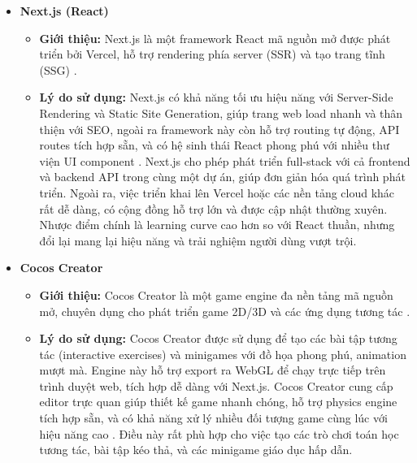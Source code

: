 \begin{itemize}
  \item \textbf{Next.js (React)}
    \begin{itemize}
      \item \textbf{Giới thiệu:} Next.js là một framework React mã nguồn mở được phát triển bởi Vercel, hỗ trợ rendering phía server (SSR) và tạo trang tĩnh (SSG) \cite{nextjsdocs}.
      \item \textbf{Lý do sử dụng:} Next.js có khả năng tối ưu hiệu năng với Server-Side Rendering và Static Site Generation, giúp trang web load nhanh và thân thiện với SEO, ngoài ra framework này còn hỗ trợ routing tự động, API routes tích hợp sẵn, và có hệ sinh thái React phong phú với nhiều thư viện UI component \cite{nextjsdocs}. Next.js cho phép phát triển full-stack với cả frontend và backend API trong cùng một dự án, giúp đơn giản hóa quá trình phát triển. Ngoài ra, việc triển khai lên Vercel hoặc các nền tảng cloud khác rất dễ dàng, có cộng đồng hỗ trợ lớn và được cập nhật thường xuyên. Nhược điểm chính là learning curve cao hơn so với React thuần, nhưng đổi lại mang lại hiệu năng và trải nghiệm người dùng vượt trội.
    \end{itemize}
    
  \item \textbf{Cocos Creator}
    \begin{itemize}
      \item \textbf{Giới thiệu:} Cocos Creator là một game engine đa nền tảng mã nguồn mở, chuyên dụng cho phát triển game 2D/3D và các ứng dụng tương tác \cite{cocoscreator38}.
      \item \textbf{Lý do sử dụng:} Cocos Creator được sử dụng để tạo các bài tập tương tác (interactive exercises) và minigames với đồ họa phong phú, animation mượt mà. Engine này hỗ trợ export ra WebGL để chạy trực tiếp trên trình duyệt web, tích hợp dễ dàng với Next.js. Cocos Creator cung cấp editor trực quan giúp thiết kế game nhanh chóng, hỗ trợ physics engine tích hợp sẵn, và có khả năng xử lý nhiều đối tượng game cùng lúc với hiệu năng cao \cite{cocoscreator38}. Điều này rất phù hợp cho việc tạo các trò chơi toán học tương tác, bài tập kéo thả, và các minigame giáo dục hấp dẫn.
    \end{itemize}


\end{itemize}
